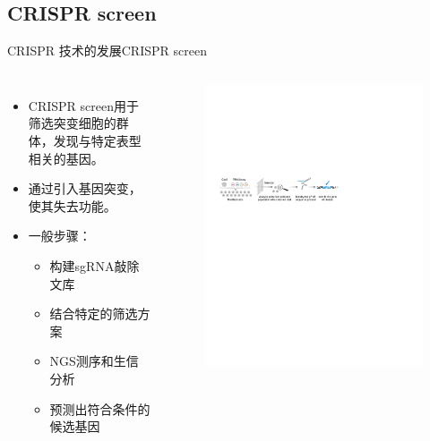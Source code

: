 \documentclass{beamer}
\begin{document}
\subsection{CRISPR screen}
\begin{frame}{CRISPR 技术的发展}{CRISPR screen}

	\begin{columns}

		\begin{itemize}
			\item CRISPR screen用于筛选突变细胞的群体，发现与特定表型相关的基因。
			\item 通过引入基因突变，使其失去功能。
			\item 一般步骤：
			\begin{itemize}
				\item 构建sgRNA敲除文库
				\item 结合特定的筛选方案
				\item NGS测序和生信分析
				\item 预测出符合条件的候选基因
			\end{itemize}
		\end{itemize}
		\begin{figure}
			\centering
			\includegraphics[width=\textwidth]{img/CRISPR_screen.pdf}
		\end{figure}


\end{columns}
\end{frame}
\end{document}
